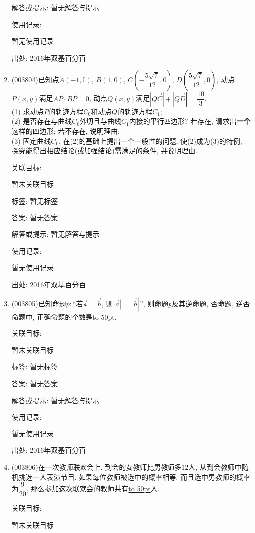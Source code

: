 \documentclass[10pt,a4paper]{article}
\newcommand{\blank}[1]{\underline{\hbox to #1pt{}}}
\begin{document}
\begin{enumerate}[1.]
解答或提示: 暂无解答与提示

使用记录:

暂无使用记录


出处: 2016年双基百分百
\item { (003804)}已知点$A(-1,0)$, $B(1,0)$, $C\left(-\dfrac{5\sqrt{7}}{12},0\right)$, $D\left(\dfrac{5\sqrt{7}}{12},0\right)$, 动点$P(x,y)$满足$\overrightarrow{AP}\cdot\overrightarrow{BP}=0$, 动点$Q(x,y)$满足$|\overrightarrow{QC}|+|\overrightarrow{QD}|=\dfrac{10}{3}$.\\
(1) 求动点$P$的轨迹方程$C_0$和动点$Q$的轨迹方程$C_1$;\\
(2) 是否存在与曲线$C_0$外切且与曲线$C_1$内接的平行四边形? 若存在, 请求出{\bf 一个}这样的四边形; 若不存在, 说明理由;\\
(3) 固定曲线$C_0$, 在(2)的基础上提出一个一般性的问题, 使(2)成为(3)的特例, 探究能得出相应结论(或加强结论)需满足的条件, 并说明理由.


关联目标:

暂未关联目标



标签: 暂无标签

答案: 暂无答案

解答或提示: 暂无解答与提示

使用记录:

暂无使用记录


出处: 2016年双基百分百
\item { (003805)}已知命题$p:$``若$\overrightarrow{a}=\overrightarrow{b}$, 则$|\overrightarrow{a}|=|\overrightarrow{b}|$'', 则命题$p$及其逆命题, 否命题, 逆否命题中, 正确命题的个数是\blank{50}.


关联目标:

暂未关联目标



标签: 暂无标签

答案: 暂无答案

解答或提示: 暂无解答与提示

使用记录:

暂无使用记录


出处: 2016年双基百分百
\item { (003806)}在一次教师联欢会上, 到会的女教师比男教师多$12$人, 从到会教师中随机挑选一人表演节目. 如果每位教师被选中的概率相等, 而且选中男教师的概率为$\dfrac 9{20}$, 那么参加这次联欢会的教师共有\blank{50}人.


关联目标:

暂未关联目标




\end{enumerate}
\end{document}
